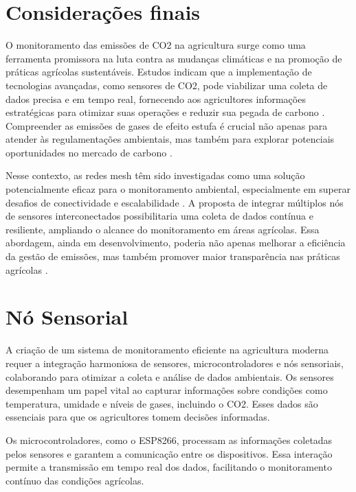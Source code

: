 \section{Considerações finais}

O monitoramento das emissões de CO2 na agricultura surge como uma ferramenta promissora na luta contra as mudanças climáticas e na promoção de práticas agrícolas sustentáveis. Estudos indicam que a implementação de tecnologias avançadas, como sensores de CO2, pode viabilizar uma coleta de dados precisa e em tempo real, fornecendo aos agricultores informações estratégicas para otimizar suas operações e reduzir sua pegada de carbono \cite{ft2024}. Compreender as emissões de gases de efeito estufa é crucial não apenas para atender às regulamentações ambientais, mas também para explorar potenciais oportunidades no mercado de carbono \cite{nature2025}.


Nesse contexto, as redes mesh têm sido investigadas como uma solução potencialmente eficaz para o monitoramento ambiental, especialmente em superar desafios de conectividade e escalabilidade \cite{tekon2024}. A proposta de integrar múltiplos nós de sensores interconectados possibilitaria uma coleta de dados contínua e resiliente, ampliando o alcance do monitoramento em áreas agrícolas. Essa abordagem, ainda em desenvolvimento, poderia não apenas melhorar a eficiência da gestão de emissões, mas também promover maior transparência nas práticas agrícolas \cite{bonirob2025}.


\section{Nó Sensorial}

A criação de um sistema de monitoramento eficiente na agricultura moderna requer a integração harmoniosa de sensores, microcontroladores e nós sensoriais, colaborando para otimizar a coleta e análise de dados ambientais. Os sensores desempenham um papel vital ao capturar informações sobre condições como temperatura, umidade e níveis de gases, incluindo o CO2. Esses dados são essenciais para que os agricultores tomem decisões informadas.

Os microcontroladores, como o ESP8266, processam as informações coletadas pelos sensores e garantem a comunicação entre os dispositivos. Essa interação permite a transmissão em tempo real dos dados, facilitando o monitoramento contínuo das condições agrícolas.

